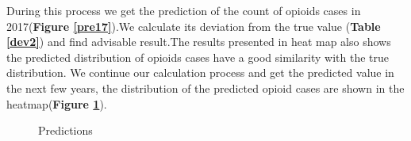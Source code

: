 \documentclass[12pt]{article}
\begin{document}
During this process we get the prediction of the count of opioids cases in 2017(\textbf{Figure \ref{pre17}}).We calculate its deviation from the true value (\textbf{Table \ref{dev2}}) and find advisable result.The results presented in heat map also shows the predicted distribution of opioids cases have a good similarity with the true distribution.
We continue our calculation process and get the predicted value in the next few years, the distribution of the predicted opioid cases are shown in the heatmap(\textbf{Figure \ref{pre}}).

\begin{figure}[h]
\centering
{}
\caption{Predictions}
\label{pre}
\end{figure}
\end{document}
